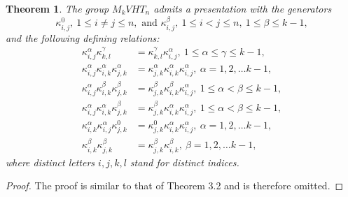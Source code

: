 \documentclass[preprint]{elsarticle}
\newtheorem{theorem}{Theorem}[section]
\begin{document}
\begin{theorem}
    The group $M_kVHT_n$ admits a presentation with the generators \[\kappa_{i,j}^0,~ 1\leq i \neq j \leq n, \text{ and } \kappa_{i,j}^{\beta},~ 1\leq i < j \leq n, ~1\leq \beta \leq k-1,\]
    and the following defining relations:
    \begin{align}
        \kappa_{i,j}^{\alpha} \kappa_{k,l}^{\gamma} &= \kappa_{k,l}^{\gamma} \kappa_{i,j}^{\alpha},~1 \leq \alpha \leq \gamma \leq k-1,\\
        \kappa_{i,j}^{\alpha} \kappa_{i,k}^{\alpha} \kappa_{j,k}^{\alpha} &= \kappa_{j,k}^{\alpha} \kappa_{i,k}^{\alpha} \kappa_{i,j}^{\alpha},~  
       \alpha=1,2,\ldots k-1,\\
         \kappa_{i,j}^{\alpha} \kappa_{i,k}^{\beta} \kappa_{j,k}^{\beta} &= \kappa_{j,k}^{\beta} \kappa_{i,k}^{\beta} \kappa_{i,j}^{\alpha},~ 
         1 \leq \alpha < \beta \leq k-1,\\
          \kappa_{i,j}^{\alpha} \kappa_{i,k}^{\alpha} \kappa_{j,k}^{\beta} &= \kappa_{j,k}^{\beta} \kappa_{i,k}^{\alpha} \kappa_{i,j}^{\alpha},~ 
          1\leq  \alpha < \beta \leq k-1,\\
           \kappa_{i,k}^{\alpha} \kappa_{i,j}^{\alpha} \kappa_{j,k}^{0} &= \kappa_{j,k}^{0} \kappa_{i,k}^{\alpha} \kappa_{i,j}^{\alpha},~  
       \alpha=1,2,\ldots k-1,\\
          \kappa_{i,k}^{\beta} \kappa_{j,k}^{\beta} &= \kappa_{j,k}^{\beta} \kappa_{i,k}^{\beta}, ~  
       \beta=1,2,\ldots k-1,
    \end{align}
    where distinct letters $i,j,k,l$ stand for distinct indices.
\end{theorem}
\begin{proof}
The proof is similar to that of Theorem 3.2 and is therefore omitted.
\end{proof}
 
\end{document}

